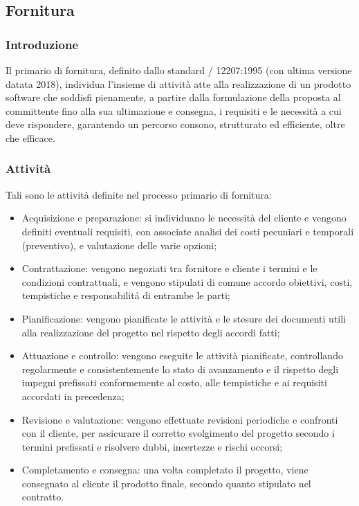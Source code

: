 
\subsection{Fornitura}

\subsubsection{Introduzione}
Il  primario di fornitura, definito dallo standard / 12207:1995 (con ultima versione datata 2018), individua l'insieme di attività atte alla realizzazione di un prodotto software che soddisfi pienamente, a partire dalla formulazione della proposta al committente fino alla sua ultimazione e consegna, i requisiti e le necessità a cui deve rispondere, garantendo un percorso consono, strutturato ed efficiente, oltre che efficace.

\subsubsection{Attività}
Tali sono le attività definite nel processo primario di fornitura:

\begin{itemize}
    \item Acquisizione e preparazione: si individuano le necessità del cliente e vengono definiti eventuali requisiti, con associate analisi dei costi pecuniari e temporali (preventivo), e valutazione delle varie opzioni;
    \item Contrattazione: vengono negoziati tra fornitore e cliente i termini e le condizioni contrattuali, e vengono stipulati di comune accordo obiettivi, costi, tempistiche e responsabilitá di entrambe le parti;
    \item Pianificazione: vengono pianificate le attività e le stesure dei documenti utili alla realizzazione del progetto nel rispetto degli accordi fatti;
    \item Attuazione e controllo: vengono eseguite le attività pianificate, controllando regolarmente e consistentemente lo stato di avanzamento e il rispetto degli impegni prefissati conformemente al costo, alle tempistiche e ai requisiti accordati in precedenza;
    \item Revisione e valutazione: vengono effettuate revisioni periodiche e confronti con il cliente, per assicurare il corretto svolgimento del progetto secondo i termini prefissati e risolvere dubbi, incertezze e rischi occorsi;
    \item Completamento e consegna: una volta completato il progetto, viene consegnato al cliente il prodotto finale, secondo quanto stipulato nel contratto.
\end{itemize}

